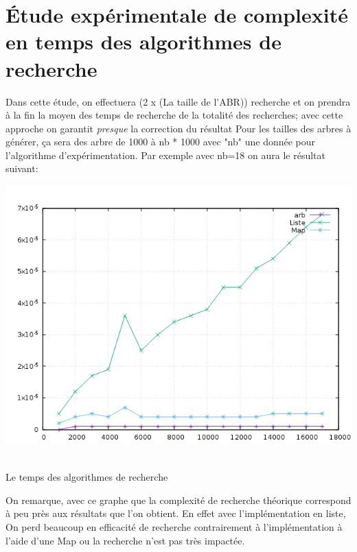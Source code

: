 \section{Étude expérimentale de complexité en temps des algorithmes de recherche}
Dans cette étude, on effectuera (2 x (La taille de l'ABR)) recherche et on prendra à la fin la moyen des temps de recherche de la totalité des recherches; avec cette approche on garantit \textit{presque} la correction du résultat  
Pour les tailles des arbres à générer, ça sera des arbre de 1000 à nb * 1000 avec "nb" une donnée pour l'algorithme d'expérimentation.  
Par exemple avec nb=18 on aura le résultat suivant:
\begin{center}
    \includegraphics[scale=0.8]{assets/rechercheTests.png}
    \caption{\\ Le temps des algorithmes de recherche}
\end{center}
On remarque, avec ce graphe que la complexité de recherche théorique correspond à peu près aux résultats que l'on obtient. En effet avec l'implémentation en liste, On perd beaucoup en efficacité de recherche contrairement à l'implémentation à l'aide d'une Map ou la recherche n'est pas très impactée.


